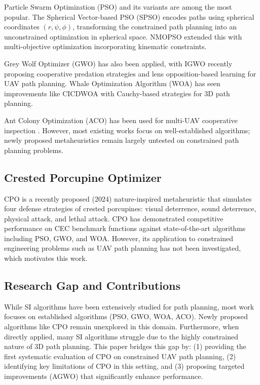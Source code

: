 \documentclass[12pt,a4paper]{article}
\begin{document}
Particle Swarm Optimization (PSO) \cite{kennedy1995} and its variants are 
among the most popular. The Spherical Vector-based PSO (SPSO) \cite{spsp} 
encodes paths using spherical coordinates $(r, \psi, \phi)$, transforming 
the constrained path planning into an unconstrained optimization in 
spherical space. NMOPSO \cite{nmopso} extended this with multi-objective 
optimization incorporating kinematic constraints.

Grey Wolf Optimizer (GWO) \cite{mirjalili2014} has also been applied, 
with IGWO \cite{igwo} recently proposing cooperative predation strategies 
and lens opposition-based learning for UAV path planning. Whale Optimization 
Algorithm (WOA) \cite{mirjalili2016} has seen improvements like CICDWOA 
\cite{cicdwoa} with Cauchy-based strategies for 3D path planning.

Ant Colony Optimization (ACO) \cite{dorigo2006} has been used for multi-UAV 
cooperative inspection \cite{aco3d}. However, most existing works focus on 
well-established algorithms; newly proposed metaheuristics remain largely 
untested on constrained path planning problems.

\subsection{Crested Porcupine Optimizer}
CPO \cite{cpo} is a recently proposed (2024) nature-inspired metaheuristic 
that simulates four defense strategies of crested porcupines: visual 
deterrence, sound deterrence, physical attack, and lethal attack. CPO 
has demonstrated competitive performance on CEC benchmark functions 
against state-of-the-art algorithms including PSO, GWO, and WOA. 
However, its application to constrained engineering problems such as 
UAV path planning has not been investigated, which motivates this work.

\subsection{Research Gap and Contributions}
While SI algorithms have been extensively studied for path planning, 
most work focuses on established algorithms (PSO, GWO, WOA, ACO). 
Newly proposed algorithms like CPO remain unexplored in this domain. 
Furthermore, when directly applied, many SI algorithms struggle due to 
the highly constrained nature of 3D path planning. This paper bridges 
this gap by: (1) providing the first systematic evaluation of CPO on 
constrained UAV path planning, (2) identifying key limitations of CPO 
in this setting, and (3) proposing targeted improvements (AGWO) that 
significantly enhance performance.
\end{document}
